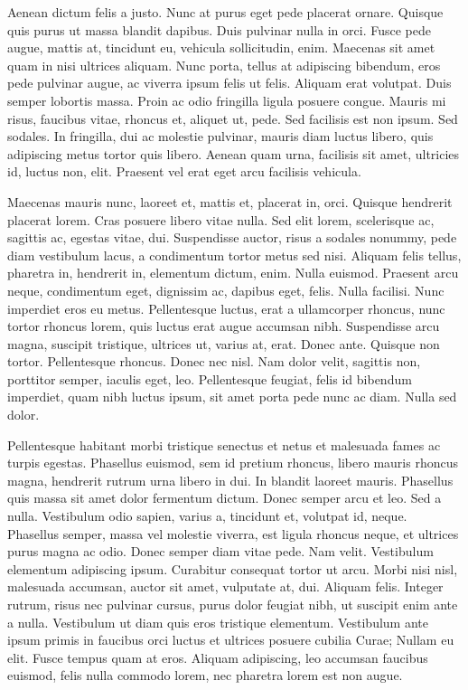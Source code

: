 \documentclass{book}
\begin{document}
Aenean dictum felis a justo. Nunc at purus eget pede placerat ornare. Quisque quis purus ut massa blandit dapibus. Duis pulvinar nulla in orci. Fusce pede augue, mattis at, tincidunt eu, vehicula sollicitudin, enim. Maecenas sit amet quam in nisi ultrices aliquam. Nunc porta, tellus at adipiscing bibendum, eros pede pulvinar augue, ac viverra ipsum felis ut felis. Aliquam erat volutpat. Duis semper lobortis massa. Proin ac odio fringilla ligula posuere congue. Mauris mi risus, faucibus vitae, rhoncus et, aliquet ut, pede. Sed facilisis est non ipsum. Sed sodales. In fringilla, dui ac molestie pulvinar, mauris diam luctus libero, quis adipiscing metus tortor quis libero. Aenean quam urna, facilisis sit amet, ultricies id, luctus non, elit. Praesent vel erat eget arcu facilisis vehicula.

Maecenas mauris nunc, laoreet et, mattis et, placerat in, orci. Quisque hendrerit placerat lorem. Cras posuere libero vitae nulla. Sed elit lorem, scelerisque ac, sagittis ac, egestas vitae, dui. Suspendisse auctor, risus a sodales nonummy, pede diam vestibulum lacus, a condimentum tortor metus sed nisi. Aliquam felis tellus, pharetra in, hendrerit in, elementum dictum, enim. Nulla euismod. Praesent arcu neque, condimentum eget, dignissim ac, dapibus eget, felis. Nulla facilisi. Nunc imperdiet eros eu metus. Pellentesque luctus, erat a ullamcorper rhoncus, nunc tortor rhoncus lorem, quis luctus erat augue accumsan nibh. Suspendisse arcu magna, suscipit tristique, ultrices ut, varius at, erat. Donec ante. Quisque non tortor. Pellentesque rhoncus. Donec nec nisl. Nam dolor velit, sagittis non, porttitor semper, iaculis eget, leo. Pellentesque feugiat, felis id bibendum imperdiet, quam nibh luctus ipsum, sit amet porta pede nunc ac diam. Nulla sed dolor.

Pellentesque habitant morbi tristique senectus et netus et malesuada fames ac turpis egestas. Phasellus euismod, sem id pretium rhoncus, libero mauris rhoncus magna, hendrerit rutrum urna libero in dui. In blandit laoreet mauris. Phasellus quis massa sit amet dolor fermentum dictum. Donec semper arcu et leo. Sed a nulla. Vestibulum odio sapien, varius a, tincidunt et, volutpat id, neque. Phasellus semper, massa vel molestie viverra, est ligula rhoncus neque, et ultrices purus magna ac odio. Donec semper diam vitae pede. Nam velit. Vestibulum elementum adipiscing ipsum. Curabitur consequat tortor ut arcu. Morbi nisi nisl, malesuada accumsan, auctor {sit} amet, vulputate at, dui. Aliquam felis. Integer rutrum, risus nec pulvinar cursus, purus dolor feugiat nibh, ut suscipit enim ante a nulla. Vestibulum ut diam quis eros tristique elementum. Vestibulum ante ipsum primis in faucibus orci luctus et ultrices posuere cubilia Curae; Nullam eu elit. Fusce tempus quam at eros. Aliquam adipiscing, leo accumsan faucibus euismod, felis nulla commodo lorem, nec pharetra lorem est non augue.
\end{document}
